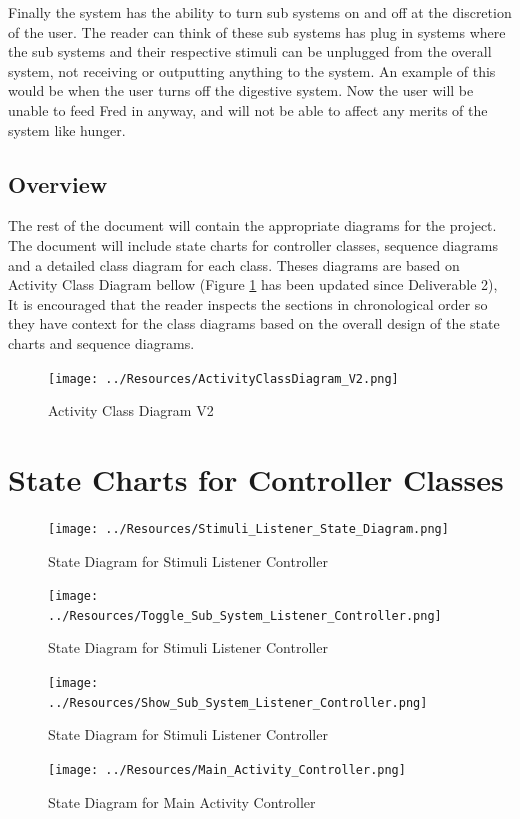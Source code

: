 \documentclass[]{article}
\begin{document}
Finally the system has the ability to turn sub systems on and off at the discretion of the user. The reader can think of these sub systems has plug in systems where the sub systems and their respective stimuli can be unplugged from the overall system, not receiving or outputting anything to the system. An example of this would be when the user turns off the digestive system. Now the user will be unable to feed Fred in anyway, and will not be able to affect any merits of the system like hunger.

\subsection{Overview}
\label{sub:overview}
The rest of the document will contain the appropriate diagrams for the project. The document will include state charts for controller classes, sequence diagrams and a detailed class diagram for each class. Theses diagrams are based on Activity Class Diagram bellow (Figure \ref{ActivityClassDiagram} has been updated since Deliverable 2), It is encouraged that the reader inspects the sections in chronological order so they have context for the class diagrams based on the overall design of the state charts and sequence diagrams.\\

\begin{figure}[H]
	\centering
	\texttt{[image: ../Resources/ActivityClassDiagram\_V2.png]}
	\caption{Activity Class Diagram V2}
	\label{ActivityClassDiagram}
\end{figure}





\section{State Charts for Controller Classes}
\label{sec:state_charts_for_controller_classes}
\begin{figure}[H]
	\centering
	\texttt{[image: ../Resources/Stimuli\_Listener\_State\_Diagram.png]}
	\caption{State Diagram for Stimuli Listener Controller}
\end{figure}
\begin{figure}[H]
	\centering
	\texttt{[image: ../Resources/Toggle\_Sub\_System\_Listener\_Controller.png]}
	\caption{State Diagram for Stimuli Listener Controller}
\end{figure}
\begin{figure}[H]
	\centering
	\texttt{[image: ../Resources/Show\_Sub\_System\_Listener\_Controller.png]}
	\caption{State Diagram for Stimuli Listener Controller}
\end{figure}
\begin{figure}[H]
	\centering
	\texttt{[image: ../Resources/Main\_Activity\_Controller.png]}
	\caption{State Diagram for Main Activity Controller}
\end{figure}
\end{document}
